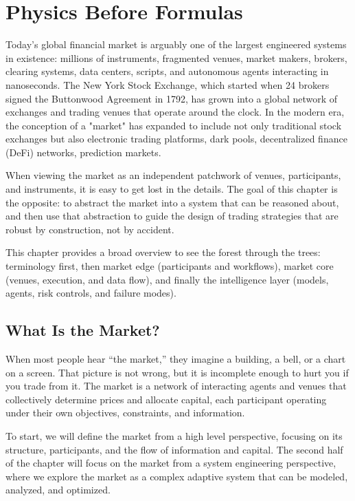 \chapter{Physics Before Formulas}

Today's global financial market is arguably one of the largest engineered systems in existence: millions of instruments, fragmented venues, market makers, brokers, clearing systems, 
data centers, scripts, and autonomous agents interacting in nanoseconds. 
The New York Stock Exchange, which started when 24 brokers signed the Buttonwood Agreement in 1792, has grown into a global network of exchanges and trading venues that operate around the clock. 
In the modern era, the conception of a "market" has expanded to include not only traditional stock exchanges but also electronic trading platforms, dark pools, decentralized finance (DeFi) networks, prediction markets.

When viewing the market as an independent patchwork of venues, participants, and instruments, 
it is easy to get lost in the details. The goal of this chapter is the opposite: 
to abstract the market into a system that can be reasoned about, and then use that 
abstraction to guide the design of trading strategies that are robust by construction, 
not by accident.

This chapter provides a broad overview to see the forest through the trees: 
terminology first, then market edge (participants and workflows), market core (venues, execution, and data flow), 
and finally the intelligence layer (models, agents, risk controls, and failure modes).

\section{What Is the Market?}

When most people hear ``the market,'' they imagine a building, a bell, or a chart on a screen. 
That picture is not wrong, but it is incomplete enough to hurt you if you trade from it. 
The market is a network of interacting agents and venues that collectively determine prices and allocate capital, each participant operating under their own objectives, constraints, and information.

To start, we will define the market from a high level perspective, focusing on its structure, participants, and the flow of information and capital.
The second half of the chapter will focus on the market from a system engineering perspective, where we explore the market as a complex adaptive system that can be modeled, analyzed, and optimized.

